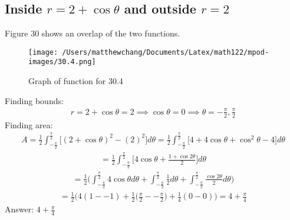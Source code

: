 \documentclass{article}
\begin{document}
\subsection{Inside $r = 2 + \cos{\theta}$ and outside $r = 2$}
Figure 30 shows an overlap of the two functions. \\[10pt]
\begin{figure}
	\centering
	\texttt{[image: /Users/matthewchang/Documents/Latex/math122/mpod-images/30.4.png]}
	\caption{Graph of function for 30.4}
\end{figure}
Finding bounds:
\begin{align*}
	r = 2 + \cos{\theta} = 2 \implies \cos{\theta} = 0 \implies \theta = -\frac{\pi}{2}, \frac{\pi}{2}
\end{align*}
Finding area:
\begin{align*}
	A = \frac{1}{2} \int_{-\frac{\pi}{2}}^{\frac{\pi}{2}} \bigg[ (2 + \cos{\theta})^2 - (2)^2 \bigg] d\theta = \frac{1}{2} \int_{-\frac{\pi}{2}}^{\frac{\pi}{2}} \bigg[ 4 + 4\cos{\theta} + \cos^2{\theta} - 4 \bigg] d\theta
\end{align*}
\begin{align*}
	= \frac{1}{2} \int_{-\frac{\pi}{2}}^{\frac{\pi}{2}} \bigg[ 4\cos{\theta} + \frac{1 + \cos{2\theta}}{2} \bigg] d\theta
\end{align*}
\begin{align*}
	= \frac{1}{2} \bigg( \int_{-\frac{\pi}{2}}^{\frac{\pi}{2}} 4\cos{\theta} d\theta + \int_{-\frac{\pi}{2}}^{\frac{\pi}{2}} \frac{1}{2}d\theta + \int_{-\frac{\pi}{2}}^{\frac{\pi}{2}} \frac{\cos{2\theta}}{2} d\theta \bigg)
\end{align*}
\begin{align*}
	= \frac{1}{2} \bigg( 4(1 - -1) + \frac{1}{2} \bigg( \frac{\pi}{2} - -\frac{\pi}{2} \bigg) + \frac{1}{4} (0 - 0) \bigg) = 4 + \frac{\pi}{4}
\end{align*}
Answer: $4 + \frac{\pi}{4}$

\end{document}
